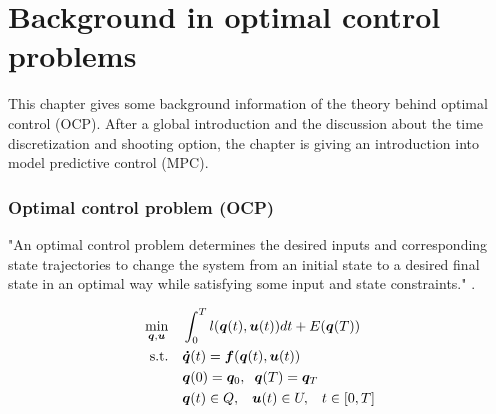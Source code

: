 \chapter{Background in optimal control problems\\}
\label{cha:OCP}

This chapter gives some background information of the theory behind optimal control (OCP). After a global introduction and the discussion about the time discretization and shooting option, the chapter is giving an introduction into model predictive control (MPC).\\

\subsection{Optimal control problem (OCP)}
"An optimal control problem determines the desired inputs and corresponding state trajectories to change the system from an initial state to a desired final state in an optimal way while satisfying some input and state constraints." \cite{Mercy2018}.

\begin{equation}
\label{eq:OCP}
\begin{aligned}
\min_{\bm{q},\bm{u}} \quad & \int_{0}^{T}l(\bm{q}(t),\bm{u}(t))dt + E(\bm{q}(T)) \\
\textrm{s.t.} \quad & \bm{\dot{q}}(t) = \bm{f}(\bm{q}(t), \bm{u}(t))\\
& \bm{q}(0)= \bm{q}_{0},\hspace{2 mm}\bm{q}(T)= \bm{q}_{T}    \\
& \bm{q}(t)\in Q,\hspace{3 mm} \bm{u}(t)\in U, \hspace{3 mm} t\in [0, T]
\end{aligned}
\end{equation}


